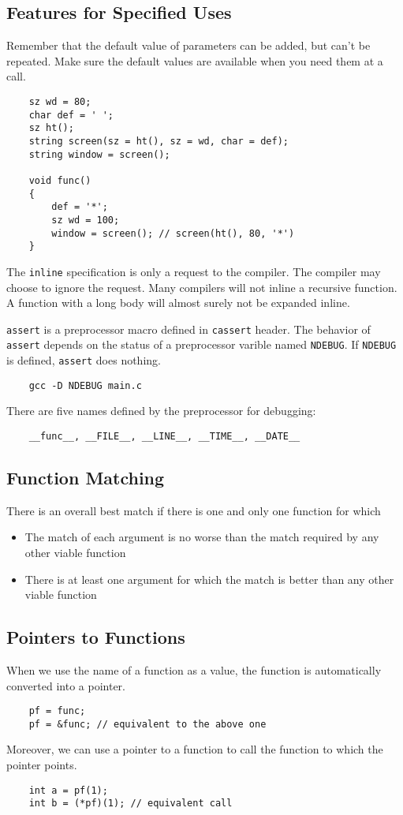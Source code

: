 \documentclass[11pt]{ctexart}
\begin{document}
\subsection{Features for Specified Uses}
\par Remember that the default value of parameters can be added, but can't be repeated. Make sure the default values are available when you need them at a call.
\begin{lstlisting}
    sz wd = 80;
    char def = ' ';
    sz ht();
    string screen(sz = ht(), sz = wd, char = def);
    string window = screen();

    void func()
    {
        def = '*';
        sz wd = 100;
        window = screen(); // screen(ht(), 80, '*')
    }
\end{lstlisting}
\par The \verb|inline| specification is only a request to the compiler. The compiler may choose to ignore the request. Many compilers will not inline a recursive function. A function with a long body will almost surely not be expanded inline.
\par \verb|assert| is a preprocessor macro defined in \verb|cassert| header. The behavior of \verb|assert| depends on the status of a preprocessor varible named \verb|NDEBUG|. If \verb|NDEBUG| is defined, \verb|assert| does nothing.
\begin{lstlisting}
    gcc -D NDEBUG main.c
\end{lstlisting}
There are five names defined by the preprocessor for debugging:
\begin{lstlisting}
    __func__, __FILE__, __LINE__, __TIME__, __DATE__
\end{lstlisting}
\subsection{Function Matching}
\par There is an overall best match if there is one and only one function for which
\begin{itemize}
    \item The match of each argument is no worse than the match required by any other viable function
    \item There is at least one argument for which the match is better than any other viable function 
\end{itemize} 
\subsection{Pointers to Functions}
When we use the name of a function as a value, the function is automatically converted into a pointer.
\begin{lstlisting}
    pf = func;
    pf = &func; // equivalent to the above one
\end{lstlisting}
\par Moreover, we can use a pointer to a function to call the function to which the pointer points.
\begin{lstlisting}
    int a = pf(1);
    int b = (*pf)(1); // equivalent call
\end{lstlisting}
\end{document}
